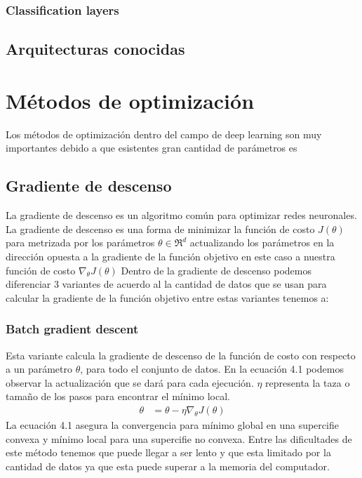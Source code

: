 \subsubsection{Classification layers}

\subsection{Arquitecturas conocidas}
\section{Métodos de optimización}
Los métodos de optimización dentro del campo de deep learning son muy importantes debido a que esistentes gran cantidad de parámetros es 

\subsection{Gradiente de descenso}
La gradiente de descenso es un algoritmo común para optimizar redes neuronales. La gradiente de descenso es una forma de minimizar la función de costo $J(\theta)$ para metrizada por los parámetros $\theta \in\Re^{d}$ actualizando los parámetros en la dirección opuesta a la gradiente de la función objetivo en este caso a nuestra función de costo $\nabla_{\theta} J(\theta)$
Dentro de la gradiente de descenso podemos diferenciar 3 variantes de acuerdo al la cantidad de datos que se usan para calcular la gradiente de la función objetivo entre estas variantes tenemos a:\\
\subsubsection{Batch gradient descent}
Esta variante calcula la gradiente de descenso de la función de costo con respecto a un parámetro $\theta$, para todo el conjunto de datos. En la ecuación 4.1 podemos observar la actualización que se dará para cada ejecución. $\eta$ representa la taza o tamaño de los pasos para encontrar el mínimo local.
\begin{equation}
\label{bgds}
\begin{aligned}
\theta &= \theta - \eta \nabla_{\theta} J(\theta)
\end{aligned}
\end{equation}
La ecuación 4.1 asegura la convergencia para mínimo global en una supercifie convexa y mínimo local para una supercifie no convexa. Entre las dificultades de este método tenemos que puede llegar a ser lento y que esta limitado por la cantidad de datos ya que esta puede superar a la memoria del computador.	
